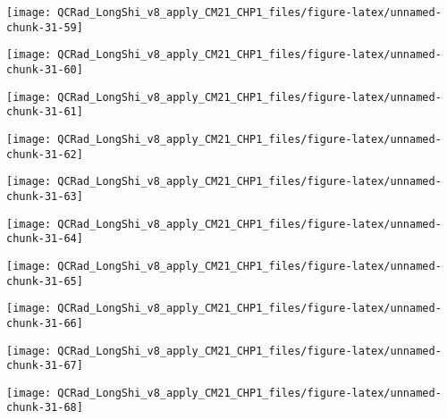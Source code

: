 \documentclass[
  10pt,
  a4paper,oneside]{article}
\begin{document}
\begin{center}\texttt{[image: QCRad\_LongShi\_v8\_apply\_CM21\_CHP1\_files/figure-latex/unnamed-chunk-31-59]} \end{center}

\begin{center}\texttt{[image: QCRad\_LongShi\_v8\_apply\_CM21\_CHP1\_files/figure-latex/unnamed-chunk-31-60]} \end{center}

\begin{center}\texttt{[image: QCRad\_LongShi\_v8\_apply\_CM21\_CHP1\_files/figure-latex/unnamed-chunk-31-61]} \end{center}

\begin{center}\texttt{[image: QCRad\_LongShi\_v8\_apply\_CM21\_CHP1\_files/figure-latex/unnamed-chunk-31-62]} \end{center}

\begin{center}\texttt{[image: QCRad\_LongShi\_v8\_apply\_CM21\_CHP1\_files/figure-latex/unnamed-chunk-31-63]} \end{center}

\begin{center}\texttt{[image: QCRad\_LongShi\_v8\_apply\_CM21\_CHP1\_files/figure-latex/unnamed-chunk-31-64]} \end{center}

\begin{center}\texttt{[image: QCRad\_LongShi\_v8\_apply\_CM21\_CHP1\_files/figure-latex/unnamed-chunk-31-65]} \end{center}

\begin{center}\texttt{[image: QCRad\_LongShi\_v8\_apply\_CM21\_CHP1\_files/figure-latex/unnamed-chunk-31-66]} \end{center}

\begin{center}\texttt{[image: QCRad\_LongShi\_v8\_apply\_CM21\_CHP1\_files/figure-latex/unnamed-chunk-31-67]} \end{center}

\begin{center}\texttt{[image: QCRad\_LongShi\_v8\_apply\_CM21\_CHP1\_files/figure-latex/unnamed-chunk-31-68]} \end{center}
\end{document}
